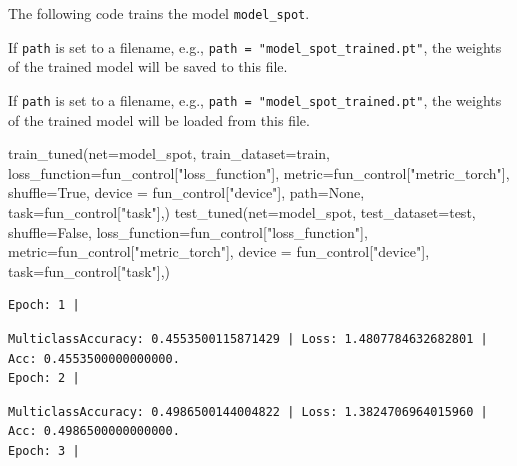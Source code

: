 \documentclass[
  letterpaper,
  DIV=11,
  numbers=noendperiod]{scrreprt}
\newenvironment{Shaded}{\begin{snugshade}}{\end{snugshade}}
\newcommand{\NormalTok}[1]{\textcolor[rgb]{0.00,0.23,0.31}{#1}}
\newcommand{\OperatorTok}[1]{\textcolor[rgb]{0.37,0.37,0.37}{#1}}
\newcommand{\StringTok}[1]{\textcolor[rgb]{0.13,0.47,0.30}{#1}}
\newcommand{\VariableTok}[1]{\textcolor[rgb]{0.07,0.07,0.07}{#1}}
\begin{document}
The following code trains the model \texttt{model\_spot}.

If \texttt{path} is set to a filename, e.g.,
\texttt{path\ =\ "model\_spot\_trained.pt"}, the weights of the trained
model will be saved to this file.

If \texttt{path} is set to a filename, e.g.,
\texttt{path\ =\ "model\_spot\_trained.pt"}, the weights of the trained
model will be loaded from this file.

\begin{Shaded}
\begin{Highlighting}[]
\NormalTok{train\_tuned(net}\OperatorTok{=}\NormalTok{model\_spot, train\_dataset}\OperatorTok{=}\NormalTok{train,}
\NormalTok{        loss\_function}\OperatorTok{=}\NormalTok{fun\_control[}\StringTok{"loss\_function"}\NormalTok{],}
\NormalTok{        metric}\OperatorTok{=}\NormalTok{fun\_control[}\StringTok{"metric\_torch"}\NormalTok{],}
\NormalTok{        shuffle}\OperatorTok{=}\VariableTok{True}\NormalTok{,}
\NormalTok{        device }\OperatorTok{=}\NormalTok{ fun\_control[}\StringTok{"device"}\NormalTok{],}
\NormalTok{        path}\OperatorTok{=}\VariableTok{None}\NormalTok{,}
\NormalTok{        task}\OperatorTok{=}\NormalTok{fun\_control[}\StringTok{"task"}\NormalTok{],)}
\NormalTok{test\_tuned(net}\OperatorTok{=}\NormalTok{model\_spot, test\_dataset}\OperatorTok{=}\NormalTok{test,}
\NormalTok{            shuffle}\OperatorTok{=}\VariableTok{False}\NormalTok{,}
\NormalTok{            loss\_function}\OperatorTok{=}\NormalTok{fun\_control[}\StringTok{"loss\_function"}\NormalTok{],}
\NormalTok{            metric}\OperatorTok{=}\NormalTok{fun\_control[}\StringTok{"metric\_torch"}\NormalTok{],}
\NormalTok{            device }\OperatorTok{=}\NormalTok{ fun\_control[}\StringTok{"device"}\NormalTok{],}
\NormalTok{            task}\OperatorTok{=}\NormalTok{fun\_control[}\StringTok{"task"}\NormalTok{],)}
\end{Highlighting}
\end{Shaded}

\begin{verbatim}
Epoch: 1 | 
\end{verbatim}

\begin{verbatim}
MulticlassAccuracy: 0.4553500115871429 | Loss: 1.4807784632682801 | Acc: 0.4553500000000000.
Epoch: 2 | 
\end{verbatim}

\begin{verbatim}
MulticlassAccuracy: 0.4986500144004822 | Loss: 1.3824706964015960 | Acc: 0.4986500000000000.
Epoch: 3 | 
\end{verbatim}
\end{document}
